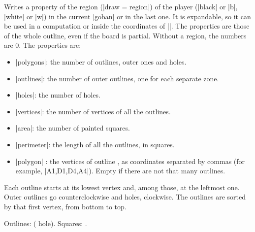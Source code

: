 	\begin{command}{\pgfgoregion{}}
		Writes a property of the region (|draw = region|) of the player (|black| or |b|, |white| or |w|) in the current |goban| or in the last one. It is expandable, so it can be used in a computation or inside the coordinates of |\marks|. The properties are those of the whole outline, even if the board is partial. Without a region, the numbers are 0. The properties are:
		\begin{itemize}
			\item |polygons|: the number of outlines, outer ones and holes.
			\item |outlines|: the number of outer outlines, one for each separate zone.
			\item |holes|: the number of holes.
			\item |vertices|: the number of vertices of all the outlines.
			\item |area|: the number of painted squares.
			\item |perimeter|: the length of all the outlines, in squares.
			\item |polygon| : the vertices of outline , as coordinates separated by commas (for example, |A1,D1,D4,A4|). Empty if there are not that many outlines.
		\end{itemize}
		Each outline starts at its lowest vertex and, among those, at the leftmost one. Outer outlines go counterclockwise and holes, clockwise. The outlines are sorted by that first vertex, from bottom to top.

		\begin{codeexample}[width=4.75cm]
			\begin{goban}[label = {at = {above, left}}]
			\end{goban}

			Outlines: 
			( hole).
			Squares: .
		\end{codeexample}
	\end{command}
